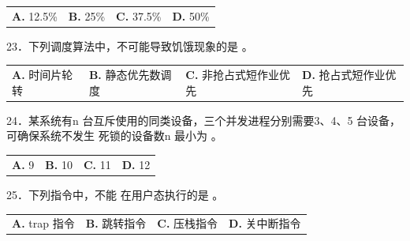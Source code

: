 \documentclass[UTF8,11pt]{ctexart}
\begin{document}
\begin{center}\begin{tabular}{>{\raggedright\arraybackslash}p{\dimexpr(\linewidth-8\tabcolsep)/4\relax}>{\raggedright\arraybackslash}p{\dimexpr(\linewidth-8\tabcolsep)/4\relax}>{\raggedright\arraybackslash}p{\dimexpr(\linewidth-8\tabcolsep)/4\relax}>{\raggedright\arraybackslash}p{\dimexpr(\linewidth-8\tabcolsep)/4\relax}}
\textbf{A.} 12.\allowbreak{}5\% & \textbf{B.} 25\% & \textbf{C.} 37.\allowbreak{}5\% & \textbf{D.} 50\%\\[.35em]\end{tabular}\end{center}

23．下列调度算法中，不可能导致饥饿现象的是 。


\begin{center}\begin{tabular}{>{\raggedright\arraybackslash}p{\dimexpr(\linewidth-8\tabcolsep)/4\relax}>{\raggedright\arraybackslash}p{\dimexpr(\linewidth-8\tabcolsep)/4\relax}>{\raggedright\arraybackslash}p{\dimexpr(\linewidth-8\tabcolsep)/4\relax}>{\raggedright\arraybackslash}p{\dimexpr(\linewidth-8\tabcolsep)/4\relax}}
\textbf{A.} 时间片轮转 & \textbf{B.} 静态优先数调度 & \textbf{C.} 非抢占式短作业优先 & \textbf{D.} 抢占式短作业优先\\[.35em]\end{tabular}\end{center}

24．某系统有n 台互斥使用的同类设备，三个并发进程分别需要3、4、5 台设备，可确保系统不发生 死锁的设备数n 最小为 。


\begin{center}\begin{tabular}{>{\raggedright\arraybackslash}p{\dimexpr(\linewidth-8\tabcolsep)/4\relax}>{\raggedright\arraybackslash}p{\dimexpr(\linewidth-8\tabcolsep)/4\relax}>{\raggedright\arraybackslash}p{\dimexpr(\linewidth-8\tabcolsep)/4\relax}>{\raggedright\arraybackslash}p{\dimexpr(\linewidth-8\tabcolsep)/4\relax}}
\textbf{A.} 9 & \textbf{B.} 10 & \textbf{C.} 11 & \textbf{D.} 12\\[.35em]\end{tabular}\end{center}

25．下列指令中，不能 在用户态执行的是 。


\begin{center}\begin{tabular}{>{\raggedright\arraybackslash}p{\dimexpr(\linewidth-8\tabcolsep)/4\relax}>{\raggedright\arraybackslash}p{\dimexpr(\linewidth-8\tabcolsep)/4\relax}>{\raggedright\arraybackslash}p{\dimexpr(\linewidth-8\tabcolsep)/4\relax}>{\raggedright\arraybackslash}p{\dimexpr(\linewidth-8\tabcolsep)/4\relax}}
\textbf{A.} trap 指令 & \textbf{B.} 跳转指令 & \textbf{C.} 压栈指令 & \textbf{D.} 关中断指令\\[.35em]\end{tabular}\end{center}
\end{document}
